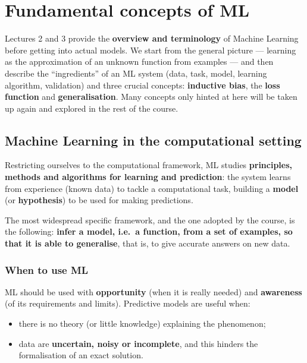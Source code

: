 \chapter{Fundamental concepts of ML}\label{ch-03}

Lectures 2 and 3 provide the \textbf{overview and terminology} of
Machine Learning before getting into actual models. We start from the
general picture --- learning as the approximation of an unknown
function from examples --- and then describe the ``ingredients'' of an
ML system (data, task, model, learning algorithm, validation) and three
crucial concepts: \textbf{inductive bias}, the \textbf{loss function}
and \textbf{generalisation}. Many concepts only hinted at here will be
taken up again and explored in the rest of the course.

\section{Machine Learning in the computational
setting}\label{il-machine-learning-in-ambito-computazionale}

Restricting ourselves to the computational framework, ML studies
\textbf{principles, methods and algorithms for learning and
prediction}: the system learns from experience (known data) to tackle a
computational task, building a \textbf{model} (or \textbf{hypothesis})
to be used for making predictions.

The most widespread specific framework, and the one adopted by the
course, is the following: \textbf{infer a model, i.e.\ a function, from
a set of examples, so that it is able to generalise}, that is, to give
accurate answers on new data.

\subsection{When to use ML}\label{quando-usare-il-ml}

ML should be used with \textbf{opportunity} (when it is really needed)
and \textbf{awareness} (of its requirements and limits). Predictive
models are useful when:

\begin{itemize}
\tightlist
\item
  there is no theory (or little knowledge) explaining the phenomenon;
\item
  data are \textbf{uncertain, noisy or incomplete}, and this hinders
  the formalisation of an exact solution.
\end{itemize}

